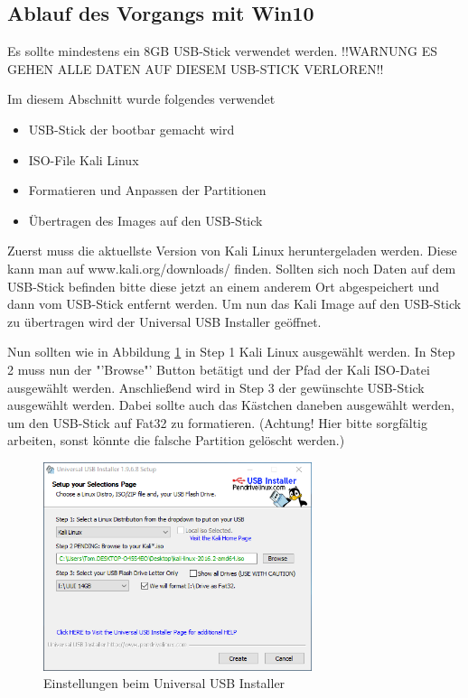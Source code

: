 \subsection{Ablauf des Vorgangs mit Win10}

Es sollte mindestens ein 8GB USB-Stick verwendet werden.
!!WARNUNG ES GEHEN ALLE DATEN AUF DIESEM USB-STICK VERLOREN!!

Im diesem Abschnitt wurde folgendes verwendet

\begin{itemize}
	\item {} USB-Stick der bootbar gemacht wird
	\item {} ISO-File Kali Linux
	\item {} Formatieren und Anpassen der Partitionen
	\item {} Übertragen des Images auf den USB-Stick
\end{itemize}

Zuerst muss die aktuellste Version von Kali Linux heruntergeladen werden. Diese kann man auf www.kali.org/downloads/ finden.
Sollten sich noch Daten auf dem USB-Stick befinden bitte diese jetzt an einem anderem Ort abgespeichert und dann vom USB-Stick entfernt werden. 
Um nun das Kali Image auf den USB-Stick zu übertragen wird der Universal USB Installer geöffnet.

Nun sollten wie in Abbildung \ref{fig:start usb installer} in Step 1 Kali Linux ausgewählt werden. In Step 2 muss nun der "'Browse"' Button betätigt und der Pfad der Kali ISO-Datei ausgewählt werden. Anschließend wird in Step 3 der gewünschte USB-Stick ausgewählt werden. Dabei sollte auch das Kästchen daneben ausgewählt werden, um den USB-Stick auf Fat32 zu formatieren. (Achtung! Hier bitte sorgfältig arbeiten, sonst könnte die falsche Partition gelöscht werden.)
	\begin{figure}[H]
		\centering
		\includegraphics[width=0.7\textwidth]{images/prep/start_usb_installer.png}
		\caption{Einstellungen beim Universal USB Installer}
		\label{fig:start usb installer}
	\end{figure}


